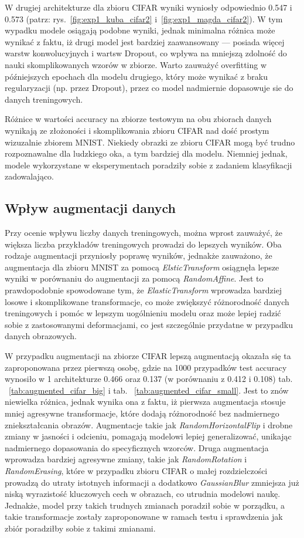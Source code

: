 \documentclass[10pt]{article}
\begin{document}
W drugiej architekturze dla zbioru CIFAR wyniki wyniosły odpowiednio 0.547 i 0.573 (patrz: rys.~\ref{fig:exp1_kuba_cifar2} i~\ref{fig:exp1_magda_cifar2}).
W tym wypadku modele osiągają podobne wyniki, jednak minimalna różnica może wynikać z faktu, iż drugi model jest bardziej zaawansowany --- posiada więcej warstw konwolucyjnych i wartsw Dropout, co wpływa na mniejszą zdolność do nauki skomplikowanych wzorów w zbiorze.
Warto zauważyć overfitting w późniejszych epochach dla modelu drugiego, który może wynikać z braku regularyzacji (np.
przez Dropout), przez co model nadmiernie dopasowuje sie do danych treningowych.

Różnice w wartości accuracy na zbiorze testowym na obu zbiorach danych wynikają ze złożoności i skomplikowania zbioru CIFAR nad dość prostym wizuzalnie zbiorem MNIST\@.
Niekiedy obrazki ze zbioru CIFAR mogą być trudno rozpoznawalne dla ludzkiego oka, a tym bardziej dla modelu.
Niemniej jednak, modele wykorzystane w eksperymentach poradziły sobie z zadaniem klasyfikacji zadowalająco.

\subsection*{Wpływ augmentacji danych}
Przy ocenie wpływu liczby danych treningowych, można wprost zauważyć, że większa liczba przykładów treningowych prowadzi do lepszych wyników.
Oba rodzaje augmentacji przyniosły poprawę wyników, jednakże zauważono, że augmentacja dla zbioru MNIST za pomocą \textit{ElsticTransform} osiągnęła lepsze wyniki w porównaniu do augmentacji za pomocą \textit{RandomAffine}.
Jest to prawdopodobnie spowodowane tym, że \textit{ElasticTransform} wprowadza bardziej losowe i skomplikowane transformacje, co może zwiększyć różnorodność danych treningowych i pomóc w lepszym uogólnieniu modelu oraz może lepiej radzić sobie z zastosowanymi deformacjami, co jest szczególnie przydatne w przypadku danych obrazowych.

W przypadku augmentacji na zbiorze CIFAR lepszą augmentacją okazała się ta zaproponowana przez pierwszą osobę, gdzie na 1000 przypadków test accuracy wynosiło w 1 architekturze 0.466 oraz 0.137 (w porównaniu z 0.412 i 0.108) tab. ~\ref{tab:augmented_cifar_big} i tab. ~\ref{tab:augmented_cifar_small}.
Jest to znów niewielka różnica, jednak wynika ona z faktu, iż pierwsza augmentacja stosuje mniej agresywne transformacje, które dodają różnorodność bez nadmiernego zniekształcania obrazów.
Augmentacje takie jak \textit{RandomHorizontalFlip} i drobne zmiany w jasności i odcieniu, pomagają modelowi lepiej generalizować, unikając nadmiernego dopasowania do specyficznych wzorców.
Druga augmentacja wprowadza bardziej agresywne zmiany, takie jak \textit{RandomRotation} i \textit{RandomErasing}, które w przypadku zbioru CIFAR o małej rozdzielczości prowadzą do utraty istotnych informacji a dodatkowo \textit{GaussianBlur} zmniejsza już niską wyrazistość kluczowych cech w obrazach, co utrudnia modelowi naukę.
Jednakże, model przy takich trudnych zmianach poradził sobie w porządku, a takie transformacje zostały zaproponowane w ramach testu i sprawdzenia jak zbiór poradziłby sobie z takimi zmianami.
\end{document}

